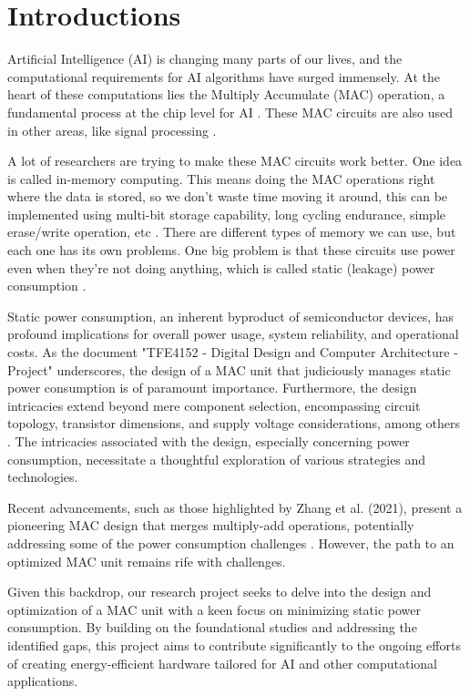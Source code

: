 \section{Introductions}

Artificial Intelligence (AI) is changing many parts of our lives, and the computational requirements for AI algorithms have surged immensely.  At the heart of these computations lies the Multiply Accumulate (MAC) operation, a fundamental process at the chip level for AI \cite{wang_2021_an}. These MAC circuits are also used in other areas, like signal processing \cite{ntnudepartmentofelectronicsystems_2023_project}.

A lot of researchers are trying to make these MAC circuits work better. One idea is called in-memory computing. This means doing the MAC operations right where the data is stored, so we don't waste time moving it around, this can be implemented using multi-bit storage capability, long cycling endurance, simple erase/write operation, etc \cite{wang_2021_an}. There are different types of memory we can use, but each one has its own problems. One big problem is that these circuits use power even when they're not doing anything, which is called static (leakage) power consumption \cite{ntnudepartmentofelectronicsystems_2023_project}.

Static power consumption, an inherent byproduct of semiconductor devices, has profound implications for overall power usage, system reliability, and operational costs. As the document "TFE4152 - Digital Design and Computer Architecture - Project" underscores, the design of a MAC unit that judiciously manages static power consumption is of paramount importance. Furthermore, the design intricacies extend beyond mere component selection, encompassing circuit topology, transistor dimensions, and supply voltage considerations, among others \cite{ntnudepartmentofelectronicsystems_2023_project}. The intricacies associated with the design, especially concerning power consumption, necessitate a thoughtful exploration of various strategies and technologies.

Recent advancements, such as those highlighted by Zhang et al. (2021), present a pioneering MAC design that merges multiply-add operations, potentially addressing some of the power consumption challenges \cite{zhang_2021_a}. However, the path to an optimized MAC unit remains rife with challenges.

Given this backdrop, our research project seeks to delve into the design and optimization of a MAC unit with a keen focus on minimizing static power consumption. By building on the foundational studies and addressing the identified gaps, this project aims to contribute significantly to the ongoing efforts of creating energy-efficient hardware tailored for AI and other computational applications.




